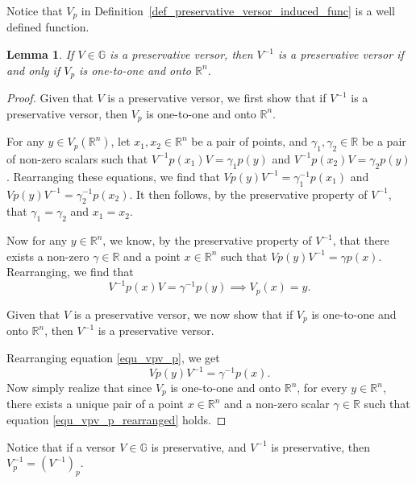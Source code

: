 \documentclass{birkjour}
\newtheorem{lem}[thm]{Lemma}
\theoremstyle{definition}
\theoremstyle{remark}
\numberwithin{equation}{section}
\newcommand{\R}{\mathbb{R}}
\newcommand{\G}{\mathbb{G}}
\begin{document}
Notice that $V_p$ in Definition~\ref{def_preservative_versor_induced_func} is a well defined function.

\begin{lem}\label{lem_when_V_p_is_a_bijection}
If $V\in\G$ is a preservative versor, then $V^{-1}$ is a preservative versor
if and only if $V_p$ is one-to-one and onto $\R^n$.
\end{lem}
\begin{proof}
Given that $V$ is a preservative versor, we first show that
if $V^{-1}$ is a preservative versor, then $V_p$ is one-to-one and onto $\R^n$.

For any $y\in V_p(\R^n)$, let $x_1,x_2\in\R^n$ be a pair of points,
and $\gamma_1,\gamma_2\in\R$ be a pair of non-zero scalars
such that $V^{-1}p(x_1)V=\gamma_1p(y)$ and $V^{-1}p(x_2)V=\gamma_2p(y)$.
Rearranging these equations, we find that $Vp(y)V^{-1}=\gamma_1^{-1}p(x_1)$
and $Vp(y)V^{-1}=\gamma_2^{-1}p(x_2)$.  It then follows, by the
preservative property of $V^{-1}$, that
$\gamma_1=\gamma_2$ and $x_1=x_2$.

Now for any $y\in\R^n$, we know, by the preservative property of $V^{-1}$,
that there exists a non-zero $\gamma\in\R$ and a point $x\in\R^n$ such that
$Vp(y)V^{-1}=\gamma p(x)$.  Rearranging, we find that
\begin{equation}
V^{-1}p(x)V=\gamma^{-1}p(y)\implies V_p(x)=y.
\end{equation}

Given that $V$ is a preservative versor, we now show that
if $V_p$ is one-to-one and onto $\R^n$, then $V^{-1}$ is a preservative versor.

Rearranging equation \eqref{equ_vpv_p}, we get
\begin{equation}\label{equ_vpv_p_rearranged}
Vp(y)V^{-1} = \gamma^{-1}p(x).
\end{equation}
Now simply realize that since $V_p$ is one-to-one and onto $\R^n$, for every $y\in\R^n$,
there exists a unique pair of a point $x\in\R^n$ and a non-zero scalar $\gamma\in\R$ such that
equation \eqref{equ_vpv_p_rearranged} holds.
\end{proof}

Notice that if a versor $V\in\G$ is preservative, and $V^{-1}$ is preservative,
then $V_p^{-1}=(V^{-1})_p$.
\end{document}
